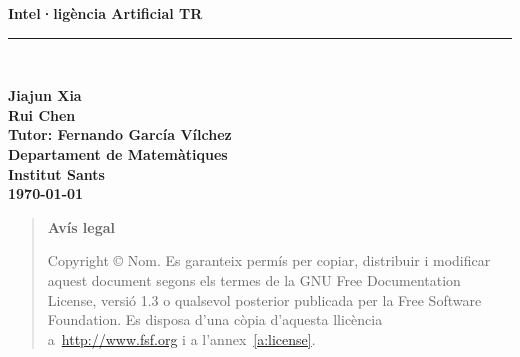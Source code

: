 
\newlength{\centeroffset}
\setlength{\centeroffset}{-0.5\oddsidemargin}
\addtolength{\centeroffset}{0.5\evensidemargin}
\thispagestyle{empty}
\noindent\hspace*{\centeroffset}\begin{minipage}{\textwidth}
\vspace*{3truecm}


\flushright
{\Huge\bfseries 
  Intel·ligència Artificial TR
}
\noindent\rule[-1ex]{\textwidth}{5pt}\\[4.5ex]
\end{minipage}

\flushright
{\bfseries 
	Jiajun Xia \\
	Rui Chen\\[2ex]
	\textcolor{black!80}{
	Tutor: Fernando García Vílchez\\
	Departament de Matemàtiques\\
	Institut Sants\\
	\today}

}


\pagebreak

\vspace*{16truecm}

	\begin{quote}
	\textbf{Avís legal}

	  Copyright \copyright{}  Nom.
	  Es garanteix permís per copiar, distribuir i modificar aquest document segons els termes de la GNU Free Documentation License, versió 1.3 o qualsevol posterior publicada per la Free Software Foundation. Es disposa d'una còpia d'aquesta llicència a~\href{http://www.fsf.org}{http://www.fsf.org} i a l'annex~\ref{a:license}.
	\end{quote}	





\endinput
